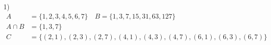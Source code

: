 1)
\begin{equation*}
\begin{split}
    A & = \{1,2,3,4,5,6,7\} \quad B = \{1,3,7,15,31,63,127\} \\
    A \cap B & = \{1,3,7 \} \\
    C & = \{(2,1),(2,3),(2,7),(4,1),(4,3),(4,7),(6,1),(6,3),(6,7)\} \\
\end{split}
\end{equation*}

